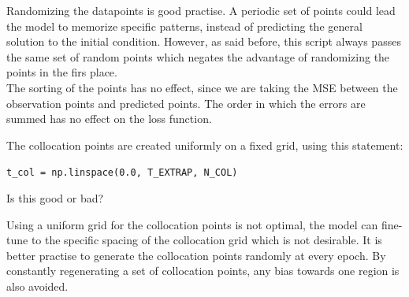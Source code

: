 \documentclass[we,twoside,openright,a4paper,11pt]{uantwerpenbamathesis}
\begin{document}
Randomizing the datapoints is good practise. A periodic set of points could lead the model to memorize specific patterns, instead of predicting the general solution to the initial condition. However, as said before, this script always passes the same set of random points which negates the advantage of randomizing the points in the firs place.\\

The sorting of the points has no effect, since we are taking the MSE between the observation points and predicted points. The order in which the errors are summed has no effect on the loss function.

\begin{tcolorbox}[title=Question 4, colback=blue!10!white, colframe=blue!40!white, sharp corners]
    The collocation points are created uniformly on a fixed grid, using this statement:
    \begin{tcolorbox}[colback=gray!10!white, colframe=gray!40!white]
        \verb|t_col = np.linspace(0.0, T_EXTRAP, N_COL)|
    \end{tcolorbox}
    Is this good or bad?
\end{tcolorbox}

Using a uniform grid for the collocation points is not optimal, the model can fine-tune to the specific spacing of the collocation grid which is not desirable. It is better practise to generate the collocation points randomly at every epoch. By constantly regenerating a set of collocation points, any bias towards one region is also avoided.
\end{document}
